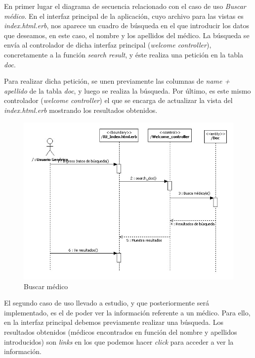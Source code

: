 \documentclass[a4paper,oneside,11pt]{book}
\begin{document}
			En primer lugar el diagrama de secuencia relacionado con el caso de uso \textit{Buscar médico}. En el interfaz principal de la aplicación, cuyo archivo para las vistas es \textit{index.html.erb}, nos aparece un cuadro de búsqueda en el que introducir los datos que deseamos, en este caso, el nombre y los apellidos del médico. La búsqueda se envía al controlador de dicha interfaz principal (\textit{welcome controller}), concretamente a la función \textit{search result}, y éste realiza una petición en la tabla \textit{doc}.
			
			Para realizar dicha petición, se unen previamente las columnas de \textit{name + apellido} de la tabla \textit{doc}, y luego se realiza la búsqueda. Por último, es este mismo controlador  (\textit{welcome controller}) el que se encarga de actualizar la vista del \textit{index.html.erb} mostrando los resultados obtenidos.
			
			\bigskip
			\bigskip
			
			\begin{figure}[H]
			  \centering
			    \includegraphics[width=16cm]{img/jpg/secuencia/01_BuscarMedico.jpg}
			  \caption{Buscar médico}
			  \label{fig:sec_general_buscarmedico}
			\end{figure}
			\newpage
			El segundo caso de uso llevado a estudio, y que posteriormente será implementado, es el de poder ver la información referente a un médico. Para ello, en la interfaz principal debemos previamente realizar una búsqueda. Los resultados obtenidos (médicos encontrados en función del nombre y apellidos introducidos) son \textit{links} en los que podemos hacer \textit{click} para acceder a ver la información.
			
\end{document}
